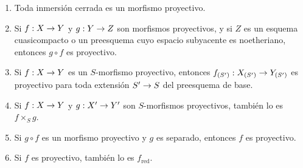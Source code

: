 \documentclass[oneside,10pt]{amsart}
\makeatletter
\newcommand{\ega@arrow}[2]{\mathchoice{#1}{#2}{#2}{#2}}
\renewcommand{\to}{\ega@arrow{\longrightarrow}{\rightarrow}}
\let\EGAOriginalLabel\label
\renewcommand{\label}[1]{\phantomsection\EGAOriginalLabel{#1}}
\makeatother
\begin{document}
\begin{proposition}[5.5.5]
\label{II.5.5.5-fr}
\medskip\noindent
\begin{enumerate}
  \item[{\rm(i)}] Toda inmersión cerrada es un morfismo proyectivo.
  \item[{\rm(ii)}] Si $f:X\to Y$ y $g:Y\to Z$ son morfismos proyectivos, y si $Z$ es un esquema cuasicompacto o un preesquema cuyo espacio subyacente es noetheriano, entonces $g\circ f$ es proyectivo.
  \item[{\rm(iii)}] Si $f:X\to Y$ es un $S$-morfismo proyectivo, entonces $f_{(S')}:X_{(S')}\to Y_{(S')}$ es proyectivo para toda extensión $S'\to S$ del preesquema de base.
  \item[{\rm(iv)}] Si $f:X\to Y$ y $g:X'\to Y'$ son $S$-morfismos proyectivos, también lo es $f\times_Sg$.
  \item[{\rm(v)}] Si $g\circ f$ es un morfismo proyectivo y $g$ es separado, entonces $f$ es proyectivo.
  \item[{\rm(vi)}] Si $f$ es proyectivo, también lo es $f_{\mathrm{red}}$.
\end{enumerate}
\end{proposition}
\end{document}
